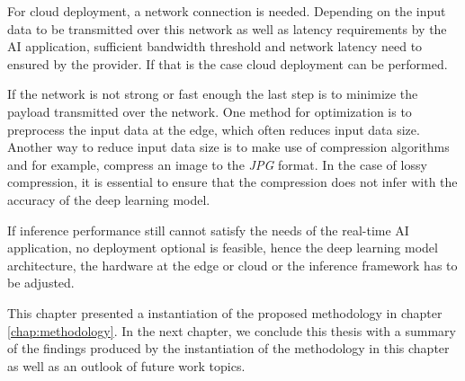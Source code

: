 For cloud deployment, a network connection is needed. Depending on the input data to be transmitted over this network as well as latency requirements by the AI application, sufficient bandwidth threshold and network latency need to ensured by the provider. 
If that is the case cloud deployment can be performed.

If the network is not strong or fast enough the last step is to minimize the payload transmitted over the network.
One method for optimization is to preprocess the input data at the edge, which often reduces input data size. 
Another way to reduce input data size is to make use of compression algorithms and for example, compress an image to the \emph{JPG} format.
In the case of lossy compression, it is essential to ensure that the compression does not infer with the accuracy of the deep learning model.

If inference performance still cannot satisfy the needs of the real-time AI application, no deployment optional is feasible, hence the deep learning model architecture, the hardware at the edge or cloud or the inference framework has to be adjusted.





\vspace{0.5cm}
This chapter presented a instantiation of the proposed methodology in chapter \ref{chap:methodology}.
In the next chapter, we conclude this thesis with a summary of the findings produced by the instantiation of the methodology in this chapter as well as an outlook of future work topics.

\endinput 
